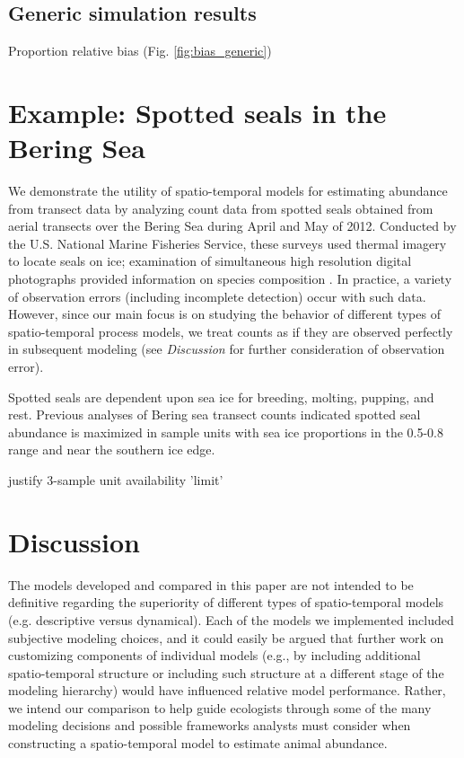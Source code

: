 \documentclass[times,mee,doublespace,]{besauth2}
\begin{document}
\subsection{Generic simulation results}

Proportion relative bias (Fig. \ref{fig:bias_generic})

\section{Example: Spotted seals in the Bering Sea}

We demonstrate the utility of spatio-temporal models for estimating abundance from transect data by analyzing
count data from spotted seals obtained from aerial transects over the Bering Sea during April and May of 2012.  Conducted by the U.S. National Marine Fisheries Service, these surveys used thermal imagery to locate seals on ice; examination of simultaneous high resolution digital photographs provided information on species composition \citep[for detailed information on survey methods, see][]{ConnEtAl2014}.  In practice, a variety of observation errors (including incomplete detection) occur with such data.  However, since our main focus is on studying the behavior of different types of spatio-temporal process models, we treat counts as if they are observed perfectly in subsequent modeling (see {\it Discussion} for further consideration of observation error).

Spotted seals are dependent upon sea ice for breeding, molting, pupping, and rest. Previous analyses of Bering sea transect counts  \citep[e.g.]{ConnEtAl2014,VerHoefEtAl2014} indicated spotted seal abundance is maximized in sample units with sea ice proportions in the 0.5-0.8 range and near the southern ice edge.

justify 3-sample unit availability 'limit'


\section{Discussion}

The models developed and compared in this paper are not intended to be definitive regarding the superiority
of different types of spatio-temporal models (e.g. descriptive versus dynamical).  Each of the models we implemented included subjective modeling choices, and it could easily be argued that further work on customizing components of individual models (e.g., by including additional spatio-temporal structure or including such structure at a different stage of the modeling hierarchy) would have influenced relative model performance.  Rather, we intend our comparison to help guide ecologists through some of the many modeling decisions and possible frameworks analysts must consider when constructing a spatio-temporal model to estimate animal abundance.
\end{document}
